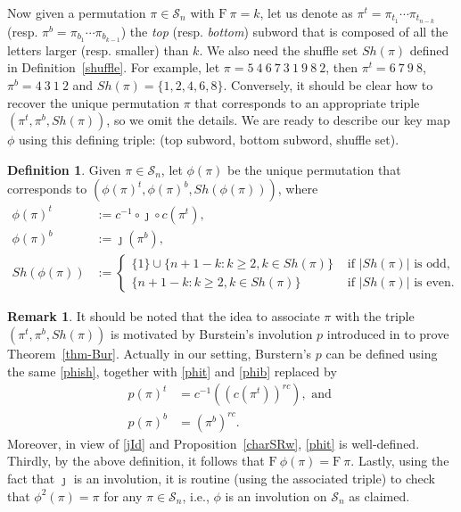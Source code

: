 \documentclass[12pt]{amsart}
\numberwithin{equation}{section}
\theoremstyle{plain}
\theoremstyle{definition}
\newtheorem{Def}[theorem]{Definition}
\newtheorem{remark}[theorem]{Remark}
\def\F{\mathrm{F}}
\def\SS{\mathcal{S}}
\begin{document}
Now given a permutation $\pi\in\SS_n$ with $\F~\pi=k$, let us denote as $\pi^t=\pi_{t_1}\cdots\pi_{t_{n-k}}$ (resp. $\pi^b=\pi_{b_1}\cdots\pi_{b_{k-1}}$) the \emph{top} (resp. \emph{bottom}) subword that is composed of all the letters larger (resp. smaller) than $k$. We also need the shuffle set $Sh(\pi)$ defined in Definition~\ref{shuffle}. For example, let $\pi=5~4~6~7~3~1~9~8~2$, then $\pi^t=6~7~9~8$, $\pi^b=4~3~1~2$ and $Sh(\pi)=\{1,2,4,6,8\}$. Conversely, it should be clear how to recover the unique permutation $\pi$ that corresponds to an appropriate triple $(\pi^t,\pi^b,Sh(\pi))$, so we omit the details. We are ready to describe our key map $\phi$ using this defining triple: (top subword, bottom subword, shuffle set).
\begin{Def}
Given $\pi\in\SS_n$, let $\phi(\pi)$ be the unique permutation that corresponds to $(\phi(\pi)^t,\phi(\pi)^b,Sh(\phi(\pi)))$, where
\begin{align}
\label{phit}\phi(\pi)^t &:= c^{-1}\circ \jmath \circ c(\pi^t),\\
\label{phib}\phi(\pi)^b &:= \jmath(\pi^b),\\
\label{phish}Sh(\phi(\pi)) &:= \begin{cases}\{1\}\cup\{n+1-k:k\geq 2, k\in Sh(\pi)\} & \text{ if }|Sh(\pi)|\text{ is odd,}\\
\{n+1-k:k\geq 2, k\in Sh(\pi)\} & \text{ if }|Sh(\pi)|\text{ is even.}
 \end{cases}
\end{align}
\end{Def}
\begin{remark}
It should be noted that the idea to associate $\pi$ with the triple $(\pi^t,\pi^b,Sh(\pi))$ is motivated by Burstein's involution $p$ introduced in \cite{Bur} to prove Theorem~\ref{thm-Bur}. Actually in our setting, Burstern's $p$ can be defined using the same \eqref{phish}, together with \eqref{phit} and \eqref{phib} replaced by
\begin{align*}
p(\pi)^t &= c^{-1}((c(\pi^t))^{rc}), \text{ and }\\
p(\pi)^b &= (\pi^b)^{rc}.
\end{align*}
Moreover, in view of \eqref{jId} and Proposition~\ref{charSRw}, \eqref{phit} is well-defined. Thirdly, by the above definition, it follows that $\F~\phi(\pi)=\F~\pi$. Lastly, using the fact that $\jmath$ is an involution, it is routine (using the associated triple) to check that $\phi^2(\pi)=\pi$ for any $\pi\in\SS_n$, i.e., $\phi$ is an involution on $\SS_n$ as claimed.
\end{remark}
\end{document}
